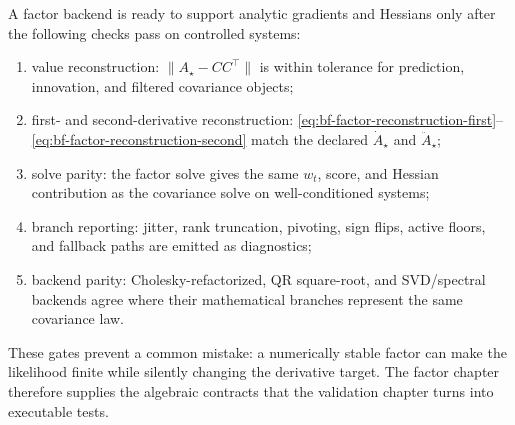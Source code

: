 A factor backend is ready to support analytic gradients and Hessians only after
the following checks pass on controlled systems:
\begin{enumerate}[label=(\roman*)]
  \item value reconstruction:
    $\|A_\star-CC^\top\|$ is within tolerance for prediction, innovation, and
    filtered covariance objects;
  \item first- and second-derivative reconstruction:
    \eqref{eq:bf-factor-reconstruction-first}--\eqref{eq:bf-factor-reconstruction-second}
    match the declared $\dot A_\star$ and $\ddot A_\star$;
  \item solve parity:
    the factor solve gives the same $w_t$, score, and Hessian contribution as
    the covariance solve on well-conditioned systems;
  \item branch reporting:
    jitter, rank truncation, pivoting, sign flips, active floors, and fallback
    paths are emitted as diagnostics;
  \item backend parity:
    Cholesky-refactorized, QR square-root, and SVD/spectral backends agree where
    their mathematical branches represent the same covariance law.
\end{enumerate}
These gates prevent a common mistake: a numerically stable factor can make the
likelihood finite while silently changing the derivative target.  The factor
chapter therefore supplies the algebraic contracts that the validation chapter
turns into executable tests.
